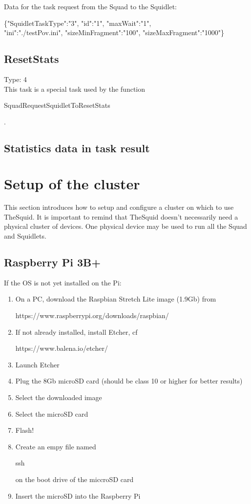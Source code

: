 Data for the task request from the Squad to the Squidlet:\\
\begin{ttfamily}\{"SquidletTaskType":"3", "id":"1", "maxWait":"1", \\
"ini":"./testPov.ini", "sizeMinFragment":"100", "sizeMaxFragment":"1000"\}\end{ttfamily}

\subsection{ResetStats}

Type: 4\\

This task is a special task used by the function \begin{ttfamily}SquadRequestSquidletToResetStats\end{ttfamily}.

\subsection{Statistics data in task result}

\section{Setup of the cluster}

This section introduces how to setup and configure a cluster on which to use TheSquid. It is important to remind that TheSquid doesn't necessarily need a physical cluster of devices. One physical device may be used to run all the Squad and Squidlets.\\

\subsection{Raspberry Pi 3B+}

If the OS is not yet installed on the Pi: 
\begin{enumerate}
\item On a PC, download the Raspbian Stretch Lite image (1.9Gb) from \begin{ttfamily}https://www.raspberrypi.org/downloads/raspbian/\end{ttfamily}
\item If not already installed, install Etcher, cf \begin{ttfamily}https://www.balena.io/etcher/\end{ttfamily}
\item Launch Etcher
\item Plug the 8Gb microSD card (should be class 10 or higher for better results)
\item Select the downloaded image
\item Select the microSD card
\item Flash!
\item Create an empy file named \begin{ttfamily}ssh\end{ttfamily} on the boot drive of the miccroSD card
\item Insert the microSD into the Raspberry Pi
\end{enumerate}

